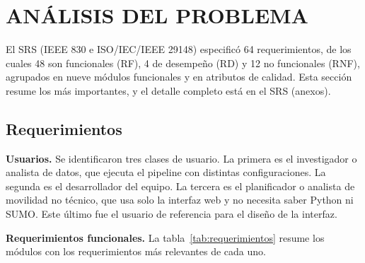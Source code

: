 \setcounter{subsection}{0}
\section{ANÁLISIS DEL PROBLEMA}

El SRS (IEEE 830 e ISO/IEC/IEEE 29148) especificó 64 requerimientos, de los cuales 48 son funcionales (RF), 4 de desempeño (RD) y 12 no funcionales (RNF), agrupados en nueve módulos funcionales y en atributos de calidad. Esta sección resume los más importantes, y el detalle completo está en el SRS (anexos).

\subsection{Requerimientos}

\textbf{Usuarios.} Se identificaron tres clases de usuario. La primera es el investigador o analista de datos, que ejecuta el pipeline con distintas configuraciones. La segunda es el desarrollador del equipo. La tercera es el planificador o analista de movilidad no técnico, que usa solo la interfaz web y no necesita saber Python ni SUMO. Este último fue el usuario de referencia para el diseño de la interfaz.

\textbf{Requerimientos funcionales.} La tabla~\ref{tab:requerimientos} resume los módulos con los requerimientos más relevantes de cada uno.

